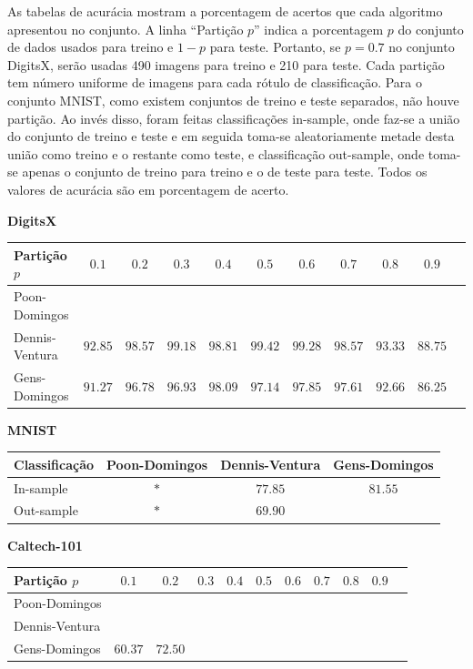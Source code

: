 \documentclass[12pt]{article}
\theoremstyle{plain}
\numberwithin{equation}{section}
\begin{document}
As tabelas de acurácia mostram a porcentagem de acertos que cada algoritmo apresentou no conjunto.
A linha ``Partição $p$'' indica a porcentagem $p$ do conjunto de dados usados para treino e $1-p$
para teste. Portanto, se $p=0.7$ no conjunto DigitsX, serão usadas 490 imagens para treino e 210
para teste. Cada partição tem número uniforme de imagens para cada rótulo de classificação. Para o
conjunto MNIST, como existem conjuntos de treino e teste separados, não houve partição. Ao invés
disso, foram feitas classificações in-sample, onde faz-se a união do conjunto de treino e teste e
em seguida toma-se aleatoriamente metade desta união como treino e o restante como teste, e
classificação out-sample, onde toma-se apenas o conjunto de treino para treino e o de teste para
teste. Todos os valores de acurácia são em porcentagem de acerto.

\begin{table}[h]
  \centering\textbf{DigitsX}\vspace{0.25cm}
  \begin{tabular}{l|cccccccccc}
    Partição $p$ & $0.1$ & $0.2$ & $0.3$ & $0.4$ & $0.5$ & $0.6$ & $0.7$ & $0.8$ & $0.9$\\
    \hline
    Poon-Domingos & & & & & & & & &\\
    Dennis-Ventura & $92.85$ & $98.57$ & $99.18$ & $98.81$ & $99.42$ & $99.28$ & $98.57$ & $93.33$ & $88.75$\\
    Gens-Domingos & $91.27$ & $96.78$ & $96.93$ & $98.09$ & $97.14$ & $97.85$ & $97.61$ & $92.66$ & $86.25$\\
  \end{tabular}
\end{table}

\begin{table}[h]
  \centering\textbf{MNIST}\vspace{0.25cm}\\
  \begin{tabular}{l|ccc}
    Classificação & Poon-Domingos & Dennis-Ventura & Gens-Domingos \\
    \hline
    In-sample & $\ast$ & $77.85$ & $81.55$ \\
    Out-sample & $\ast$ & $69.90$ & \\
  \end{tabular}
\end{table}

\begin{table}[h]
  \centering\textbf{Caltech-101}\vspace{0.25cm}\\
  \begin{tabular}{l|cccccccccc}
    Partição $p$ & $0.1$ & $0.2$ & $0.3$ & $0.4$ & $0.5$ & $0.6$ & $0.7$ & $0.8$ & $0.9$\\
    \hline
    Poon-Domingos & & & & & & & & &\\
    Dennis-Ventura & & & & & & & & &\\
    Gens-Domingos & $60.37$ & $72.50$ & & & & & & &\\
  \end{tabular}
\end{table}
\end{document}
